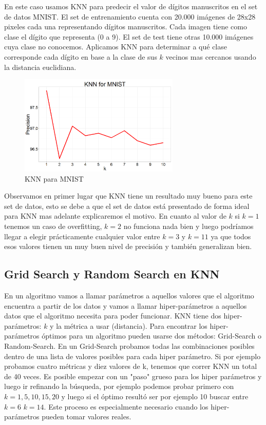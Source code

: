En este caso usamos KNN para predecir el valor de dígitos manuscritos en el set de datos MNIST. El set de entrenamiento cuenta con 20.000 imágenes de 28x28 pixeles cada una representando dígitos manuscritos. Cada imagen tiene como clase el dígito que representa (0 a 9). El set de test tiene otras 10.000 imágenes cuya clase no conocemos. Aplicamos KNN para determinar a qué clase corresponde cada dígito en base a la clase de sus $k$ vecinos mas cercanos usando la distancia euclidiana.

\begin{figure}[!htb]
\centering
\includegraphics[width=3in]{figures/knn-mnist-fig.png}
\caption{KNN para MNIST}
\label{fig17}

\end{figure}

Observamos en primer lugar que KNN tiene un resultado muy bueno para este set de datos, esto se debe a que el set de datos está presentado de forma ideal para KNN mas adelante explicaremos el motivo. En cuanto al valor de $k$ si  $k=1$ tenemos un caso de overfitting, $k=2$ no funciona nada bien y luego podríamos llegar a elegir prácticamente cualquier valor entre $k=3$ y $k=11$ ya que todos esos valores tienen un muy buen nivel de precisión y también generalizan bien.

\subsection{Grid Search y Random Search en KNN}

En un algoritmo vamos a llamar parámetros a aquellos valores que el algoritmo encuentra a partir de los datos y vamos a llamar hiper-parámetros a aquellos datos que el algoritmo necesita para poder funcionar. KNN tiene dos hiper-parámetros: $k$ y la métrica a usar (distancia). Para encontrar los hiper-parámetros óptimos para un algoritmo pueden usarse dos métodos: Grid-Search o Random-Search. En un Grid-Search probamos todas las combinaciones posibles dentro de una lista de valores posibles para cada hiper parámetro. Si por ejemplo probamos cuatro métricas y diez valores de k, tenemos que correr KNN un total de 40 veces. Es posible empezar con un "paso" grueso para los hiper parámetros y luego ir refinando la búsqueda, por ejemplo podemos probar primero con $k=1,5,10,15,20$ y luego si el óptimo resultó ser por ejemplo 10 buscar entre $k=6 $ $k=14$. Este proceso es especialmente necesario cuando los hiper-parámetros pueden tomar valores reales.

